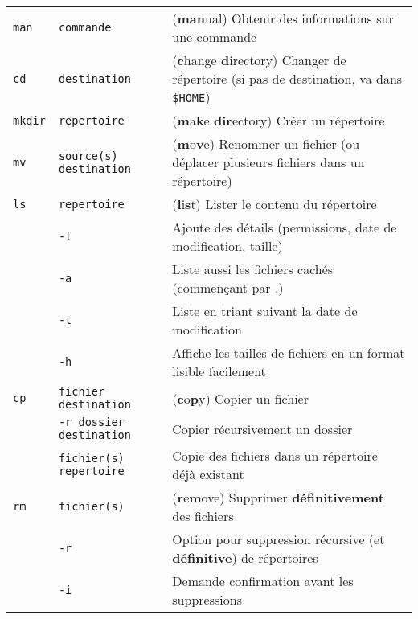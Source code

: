 \documentclass [a4paper]{article}
\begin{document}
\noindent
\begin{tabular}{ lll }
\hline
{\verb+man+}    & \verb+commande+                   & (\textbf{man}ual) Obtenir des informations sur une commande \\ 
{\verb+cd+}     & \verb+destination+                & (\textbf{c}hange \textbf{d}irectory) Changer de répertoire (si pas de destination, va dans \verb+$HOME+)\\
{\verb+mkdir+}  & \verb+repertoire+                 & (\textbf{m}a\textbf{k}e \textbf{dir}ectory) Créer un répertoire \\
{\verb+mv+}     & \verb+source(s) destination+      & (\textbf{m}o\textbf{v}e) Renommer un fichier (ou déplacer plusieurs fichiers dans un répertoire) \\
{\verb+ls+}     & \verb+repertoire+                 & (\textbf{l}i\textbf{s}t) Lister le contenu du répertoire \\
                & \hspace{-0.6cm}\verb+-l+                         & \hspace{0.4cm} Ajoute des détails (permissions, date de modification, taille)\\
                & \hspace{-0.6cm}\verb+-a+                         & \hspace{0.4cm} Liste aussi les fichiers cachés (commençant par .)\\
                & \hspace{-0.6cm}\verb+-t+                         & \hspace{0.4cm} Liste en triant suivant la date de modification\\
                & \hspace{-0.6cm}\verb+-h+                         & \hspace{0.4cm} Affiche les tailles de fichiers en un format lisible facilement\\
{\verb+cp+}     & \verb+fichier destination+        & (\textbf{c}o\textbf{p}y) Copier un fichier\\
                & \hspace{-0.6cm}\verb+-r dossier destination+     & \hspace{0.4cm} Copier récursivement un dossier\\
                & \verb+fichier(s) repertoire+                     & \hspace{0.4cm} Copie des fichiers dans un répertoire déjà existant\\
{\verb+rm+}     & \verb+fichier(s)+                 & (\textbf{r}e\textbf{m}ove) Supprimer \textbf{définitivement} des fichiers \\
                & \hspace{-0.6cm}\verb+-r+                         & \hspace{0.4cm} Option pour suppression récursive (et \textbf{définitive}) de répertoires\\
                & \hspace{-0.6cm}\verb+-i+                         & \hspace{0.4cm} Demande confirmation avant les suppressions \\
\hline
\end{tabular}
\end{document}
